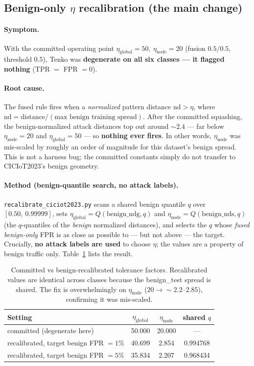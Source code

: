 \documentclass[11pt]{article}
\newcommand{\etag}{\ensuremath{\eta_{\mathrm{global}}}}
\newcommand{\etan}{\ensuremath{\eta_{\mathrm{node}}}}
\begin{document}
\subsection{Benign-only $\eta$ recalibration (the main change)}
\label{sec:eta}

\paragraph{Symptom.} With the committed operating point $\etag=50,\ \etan=20$ (fusion $0.5/0.5$,
threshold $0.5$), Tenko was \textbf{degenerate on all six classes --- it flagged nothing}
(TPR $=$ FPR $= 0$).

\paragraph{Root cause.} The fused rule fires when a \emph{normalized} pattern distance
$\text{nd} > \eta$, where $\text{nd} = \text{distance}/(\text{max benign training spread})$. After
the committed squashing, the benign-normalized attack distances top out around $\sim 2.4$ --- far
below $\etan=20$ and $\etag=50$ --- so \textbf{nothing ever fires}. In other words, \etan{} was
mis-scaled by roughly an order of magnitude for this dataset's benign spread. This is not a harness
bug; the committed constants simply do not transfer to CICIoT2023's benign geometry.

\paragraph{Method (benign-quantile search, no attack labels).} \texttt{recalibrate\_ciciot2023.py}
scans a shared benign quantile $q$ over $[0.50,\ 0.99999]$, sets
$\etag=Q(\text{benign\_ndg},q)$ and $\etan=Q(\text{benign\_nds},q)$ (the $q$-quantiles of the
\emph{benign} normalized distances), and selects the $q$ whose \emph{fused benign-only} FPR is as
close as possible to --- but not above --- the target. Crucially, \textbf{no attack labels are used}
to choose $\eta$; the values are a property of benign traffic only. Table~\ref{tab:eta} lists the
result.

\begin{table}[t]
\centering
\caption{Committed vs benign-recalibrated tolerance factors. Recalibrated values are identical across
classes because the benign\_test spread is shared. The fix is overwhelmingly on \etan{} ($20
\rightarrow \sim 2.2$--$2.85$), confirming it was mis-scaled.}
\label{tab:eta}
\begin{tabular}{lccc}
\toprule
\textbf{Setting} & $\etag$ & $\etan$ & \textbf{shared $q$} \\
\midrule
committed (degenerate here) & 50.000 & 20.000 & --- \\
recalibrated, target benign FPR $= 1\%$ & 40.699 & 2.854 & 0.994768 \\
recalibrated, target benign FPR $= 5\%$ & 35.834 & 2.207 & 0.968434 \\
\bottomrule
\end{tabular}
\end{table}
\end{document}
